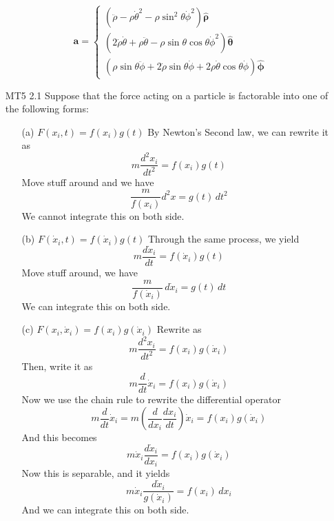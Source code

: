 \documentclass[12pt]{article}
\newcommand{\dydx}[2]{\frac{d #1}{d #2}}
\newcommand{\paren}[1]{\left( #1 \right)}
\newcommand{\untheta}{\hat{\boldsymbol\theta}}
\newcommand{\unphi}{\hat{\boldsymbol\phi}}
\newcommand{\unrho}{\hat{\boldsymbol\rho}}
\begin{document}
\begin{enumerate}
    \[
    \mathbf{a} = \begin{cases}
        \paren{\ddot{\rho} - \rho\dot{\theta}^2-\rho\sin^2\theta\dot\phi^2}\unrho\\
        \paren{2\dot\rho\dot\theta + \rho\ddot{\theta} -\rho\sin\theta\cos\theta\dot\phi^2}\untheta\\
        \paren{\rho\sin\theta\ddot{\phi}+2\dot\rho\sin\theta\dot\phi + 2\rho\dot\theta\cos\theta\dot\phi} \unphi
    \end{cases}
    \]
    \newpage
    \item[MT5 2.1] Suppose that the force acting on a particle is factorable into one of the following forms:

        \begin{itemize}
            \item[(a)] $F(x_i, t) = f(x_i) g(t)$
            By Newton's Second law, we can rewrite it as
            \[
            m\dydx{^2x_i}{t^2} = f(x_i)g(t)
            \]
            Move stuff around and we have
            \[
            \frac{m}{f(x_i)}d^2x = g(t)\,dt^2
            \]
            We cannot integrate this on both side.
            \item[(b)] $F(\dot{x}_i, t) = f(\dot{x}_i) g(t)$
            Through the same process, we yield 
            \[
            m\dydx{\dot{x}_i}{t} = f(\dot{x}_i)g(t)
            \]
            Move stuff around, we have
            \[
            \frac{m}{f(\dot{x}_i)} \,d\dot{x}_i = g(t)\,dt
            \]
            We can integrate this on both side. 
            \item[(c)] $F(x_i, \dot{x}_i) = f(x_i) g(\dot{x}_i)$
            Rewrite as
            \[
            m\dydx{^2x_i}{t^2} = f(x_i) g(\dot{x}_i)
            \]
            Then, write it as
            \[
            m\dydx{}{t}\dot{x}_i = f(x_i) g(\dot{x}_i)
            \]
            Now we use the chain rule to rewrite the differential operator
            \[
            m\dydx{}{t}\dot{x}_i  = m\paren{\dydx{}{x_i}\dydx{x_i}{t} }\dot{x}_i= f(x_i) g(\dot{x}_i)
            \]
            And this becomes
            \[
            m\dot{x}_i\dydx{\dot{x}_i}{x_i} = f(x_i) g(\dot{x}_i)
            \]
            Now this is separable, and it yields
            \[
            m\dot{x}_i\frac{d\dot{x}_i}{g(\dot{x}_i)} = f(x_i)\,dx_i
            \]
            And we can integrate this on both side. 
            
        \end{itemize}


    

    

    
    
        

        
        
        
                    
    

        



        





\end{enumerate}
\end{document}

